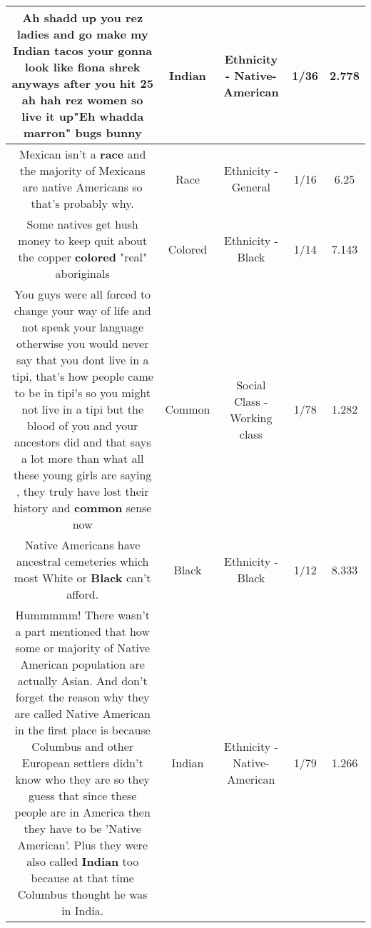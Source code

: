 \documentclass[11pt]{article}
\newlength\mylength
\begin{document}
\begin{center}
\begin{longtable}{|C{.65\mylength}|C{.30\mylength}|C{.12\mylength}|C{.12\mylength}|C{.12\mylength}|}
  \small Ah shadd up you rez ladies and go make my \textbf{Indian} tacos your gonna look like fiona shrek anyways after you hit 25 ah hah rez women so live it up"Eh whadda marron"  bugs bunny\normalsize   & Indian & Ethnicity - Native-American & 1/36 & 2.778 \\  \hline
  \small Mexican isn't a \textbf{race} and the majority  of Mexicans are native Americans so that's probably why.\normalsize   & Race & Ethnicity - General & 1/16 & 6.25 \\  \hline
  \small Some natives get hush money to keep quit about the copper \textbf{colored} "real" aboriginals\normalsize   & Colored & Ethnicity - Black & 1/14 & 7.143 \\  \hline
  \small You guys were all forced to change your way of life and not speak your language otherwise you would never say that you dont live in a tipi, that's how people came to be in tipi's so you might not live in a tipi but the blood of you and your ancestors did and that says a lot more than what all these young girls are saying , they truly have lost their history and \textbf{common} sense now\normalsize   & Common & Social Class - Working class & 1/78 & 1.282 \\  \hline
  \small Native Americans have ancestral cemeteries which most White or \textbf{Black}  can't afford.\normalsize   & Black & Ethnicity - Black & 1/12 & 8.333 \\  \hline
  \small Hummmmm! There wasn't a part mentioned that how some or majority of Native American population are actually Asian. And don't forget the reason why they are called Native American in the first place is because Columbus and other European settlers didn't know who they are so they guess that since these people are in America then they have to be 'Native American'. Plus they were also called \textbf{Indian} too because at that time Columbus thought he was in India.\normalsize   & Indian & Ethnicity - Native-American & 1/79 & 1.266 \\  \hline

\end{longtable}
\end{center}
\end{document}
